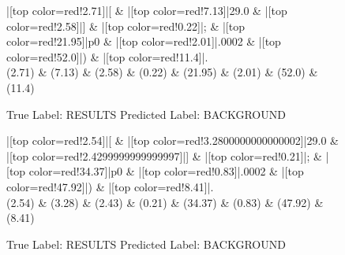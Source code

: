 \documentclass[a4paper, landscape]{article}
\begin{document}
\begin{figure}
\begin{center}
\begin{dependency}
\begin{deptext}
|[top color=red!2.71]|[ \& |[top color=red!7.13]|29.0 \& |[top color=red!2.58]|] \& |[top color=red!0.22]|; \& |[top color=red!21.95]|p0 \& |[top color=red!2.01]|.0002 \& |[top color=red!52.0]|) \& |[top color=red!11.4]|.\\
(2.71) \& (7.13) \& (2.58) \& (0.22) \& (21.95) \& (2.01) \& (52.0) \& (11.4)\\
\end{deptext}
\end{dependency}
\end{center}
\caption{True Label: RESULTS Predicted Label: BACKGROUND}
\end{figure}
\clearpage
\begin{figure}
\begin{center}
\begin{dependency}
\begin{deptext}
|[top color=red!2.54]|[ \& |[top color=red!3.2800000000000002]|29.0 \& |[top color=red!2.4299999999999997]|] \& |[top color=red!0.21]|; \& |[top color=red!34.37]|p0 \& |[top color=red!0.83]|.0002 \& |[top color=red!47.92]|) \& |[top color=red!8.41]|.\\
(2.54) \& (3.28) \& (2.43) \& (0.21) \& (34.37) \& (0.83) \& (47.92) \& (8.41)\\
\end{deptext}
\end{dependency}
\end{center}
\caption{True Label: RESULTS Predicted Label: BACKGROUND}
\end{figure}
\clearpage
\end{document}
